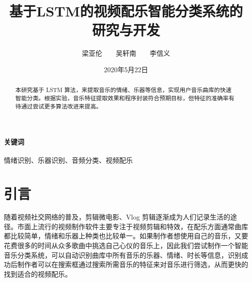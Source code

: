 \documentclass[a4paper,utf8,10pt]{article}
\title{基于LSTM的视频配乐智能分类系统的研究与开发}
\author{梁亚伦　　吴轩南　　李信义}
\date{2020年5月22日}
\begin{document}
\maketitle

\begin{abstract}
本研究基于 LSTM 算法，来提取音乐的情绪、乐器等信息，实现用户音乐曲库的快速智能分类。根据实验，音乐特征提取效果和程序封装符合预期目标，但特征的准确率有待通过尝试更多算法改进来提高。
\end{abstract}

\paragraph{关键词} 情绪识别、乐器识别、音频分类、视频配乐
\vspace{\baselineskip}

\section{引言}

随着视频社交网络的普及，剪辑微电影、Vlog 剪辑逐渐成为人们记录生活的途径。市面上流行的视频制作软件主要专注于视频剪辑和特效，在配乐方面通常曲库都比较简单，情绪和乐器上种类也比较单一。如果制作者想使用自己的音乐，又要花费很多的时间从众多歌曲中挑选自己心仪的音乐上，因此我们尝试制作一个智能音乐分类系统，可以自动识别曲库中所有音乐的乐器、情绪、时长等信息，识别成功后制作者可以在搜索框通过搜索所需音乐的特征来对音乐进行筛选，从而更快的找到适合的视频配乐。
\end{document}
